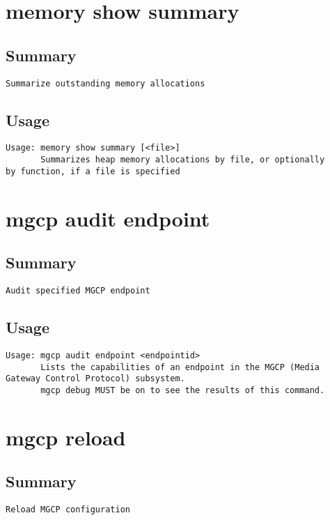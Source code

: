 \section{memory show summary}
\subsection{Summary}
\begin{verbatim}
Summarize outstanding memory allocations
\end{verbatim}
\subsection{Usage}
\begin{verbatim}
Usage: memory show summary [<file>]
       Summarizes heap memory allocations by file, or optionally
by function, if a file is specified

\end{verbatim}


\section{mgcp audit endpoint}
\subsection{Summary}
\begin{verbatim}
Audit specified MGCP endpoint
\end{verbatim}
\subsection{Usage}
\begin{verbatim}
Usage: mgcp audit endpoint <endpointid>
       Lists the capabilities of an endpoint in the MGCP (Media Gateway Control Protocol) subsystem.
       mgcp debug MUST be on to see the results of this command.

\end{verbatim}


\section{mgcp reload}
\subsection{Summary}
\begin{verbatim}
Reload MGCP configuration
\end{verbatim}
